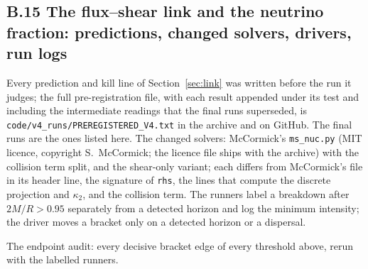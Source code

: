 \documentclass[11pt]{article}
\begin{document}
\subsection*{B.15 The flux--shear link and the neutrino fraction: predictions, changed solvers, drivers, run logs}
Every prediction and kill line of Section~\ref{sec:link} was written before the run it judges; the full pre-registration file, with each result appended under its test and including the intermediate readings that the final runs superseded, is \texttt{code/v4\_runs/PREREGISTERED\_V4.txt} in the archive and on GitHub. The final runs are the ones listed here. The changed solvers: McCormick's \texttt{ms\_nuc.py} (MIT licence, copyright S.~McCormick; the licence file ships with the archive) with the collision term split, and the shear-only variant; each differs from McCormick's file in its header line, the signature of \texttt{rhs}, the lines that compute the discrete projection and $\kappa_2$, and the collision term. The runners label a breakdown after $2M/R>0.95$ separately from a detected horizon and log the minimum intensity; the driver moves a bracket only on a detected horizon or a dispersal.






























The endpoint audit: every decisive bracket edge of every threshold above, rerun with the labelled runners.

\end{document}
